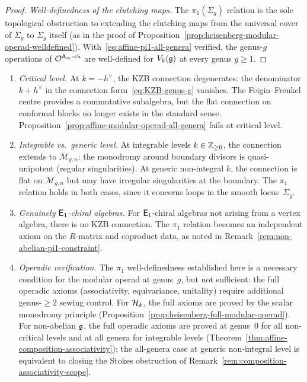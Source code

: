 \begin{proof}
\medskip\noindent
\emph{Well-definedness of the clutching maps.}
The $\pi_1(\Sigma_g)$ relation is the sole
topological obstruction to extending the clutching
maps from the universal cover of $\Sigma_g$ to
$\Sigma_g$ itself
\textup{(}as in the proof of
Proposition~\ref{prop:heisenberg-modular-operad-welldefined}\textup{)}.
With~\eqref{eq:affine-pi1-all-genera} verified,
the genus-$g$ operations of
$\mathcal{O}^{\mathsf{A}_{\infty}\text{-ch}}$ are well-defined
for $V_k(\mathfrak{g})$ at every genus $g \ge 1$.
\end{proof}

\begin{remark}
\label{rem:affine-modular-operad-scope}
\begin{enumerate}[label=\textup{(\alph*)}]
\item \emph{Critical level.}
At $k = -h^\vee$, the KZB connection
degenerates: the denominator $k + h^\vee$ in the
connection form~\eqref{eq:KZB-genus-g} vanishes.
The Feigin--Frenkel centre provides a commutative
subalgebra, but the flat connection on conformal
blocks no longer exists in the standard sense.
Proposition~\ref{prop:affine-modular-operad-all-genera}
fails at critical level.
\item \emph{Integrable vs.\ generic level.}
At integrable levels $k \in \mathbb{Z}_{\ge 0}$,
the connection extends to
$\overline{\mathcal{M}}_{g,n}$: the monodromy
around boundary divisors is quasi-unipotent
\textup{(}regular singularities\textup{)}.
At generic non-integral $k$, the connection is
flat on $\mathcal{M}_{g,n}$ but may have irregular
singularities at the boundary.
The $\pi_1$ relation holds in both cases, since
it concerns loops in the smooth
locus~$\Sigma_g$.
\item \emph{Genuinely $\mathsf{E}_1$-chiral algebras.}
For $\mathsf{E}_1$-chiral algebras not arising from
a vertex algebra, there is no KZB connection.
The $\pi_1$ relation becomes an independent
axiom on the $R$-matrix and coproduct data,
as noted in
Remark~\ref{rem:non-abelian-pi1-constraint}.
\item \emph{Operadic verification.}
The $\pi_1$ well-definedness established here
is a necessary condition for the modular operad
at genus~$g$, but not sufficient: the full
operadic axioms
\textup{(}associativity, equivariance,
unitality\textup{)} require additional
genus-$\ge 2$ sewing control.
For $\mathcal{H}_k$, the full axioms are proved by the
scalar monodromy principle
\textup{(}Proposition~\ref{prop:heisenberg-full-modular-operad}\textup{)}.
For non-abelian $\mathfrak{g}$, the full operadic axioms are
proved at genus~$0$ for all non-critical levels and
at all genera for integrable levels
\textup{(}Theorem~\ref{thm:affine-composition-associativity}\textup{)};
the all-genera case at generic non-integral level
is equivalent to closing the Stokes obstruction of
Remark~\ref{rem:composition-associativity-scope}.
\end{enumerate}
\end{remark}

